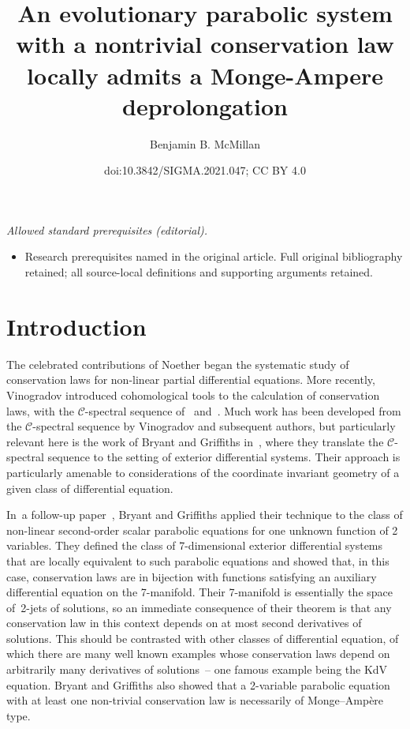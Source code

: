 \documentclass[10pt,a4paper]{amsart}
\title{An evolutionary parabolic system with a nontrivial conservation law locally admits a Monge-Ampere deprolongation}
\author{Benjamin B. McMillan}
\date{doi:10.3842/SIGMA.2021.047; CC BY 4.0}
\numberwithin{equation}{section}
\begin{document}
\maketitle
\noindent\textit{Allowed standard prerequisites (editorial).}\begin{itemize}
\item Research prerequisites named in the original article. Full original bibliography retained; all source-local definitions and supporting arguments retained.
\end{itemize}\medskip
\section{Introduction}

The celebrated contributions of Noether began the systematic study of conservation laws for non-linear partial differential equations. More recently, Vinogradov introduced cohomological tools to the calculation of conservation laws, with the $\mathcal{C}$-spectral sequence of~\cite{Vinogradov:C-SpectralSequenceI} and~\cite{Vinogradov:C-SpectralSequenceII}. Much work has been developed from the $\mathcal{C}$-spectral sequence by Vinogradov and subsequent authors, but particularly relevant here is the work of Bryant and Griffiths in~\cite{Characteristic_Cohomology_I}, where they translate the $\mathcal{C}$-spectral sequence to the setting of exterior differential systems. Their approach is particularly amenable to considerations of the coordinate invariant geometry of a given class of differential equation.

In~a follow-up paper~\cite{Characteristic_Cohomology_II}, Bryant and Griffiths applied their technique to the class of non-linear second-order scalar parabolic equations for one unknown function of 2 variables. They defined the class of 7-dimensional exterior differential systems that are locally equivalent to such parabolic equations and showed that, in this case, conservation laws are in bijection with functions satisfying an auxiliary differential equation on the 7-manifold. Their 7-manifold is essentially the space of~2-jets of solutions, so an immediate consequence of their theorem is that any conservation law in this context depends on at most second derivatives of solutions. This should be contrasted with other classes of differential equation, of which there are many well known examples whose conservation laws depend on arbitrarily many derivatives of solutions~-- one famous example being the KdV equation. Bryant and Griffiths also showed that a 2-variable parabolic equation with at least one non-trivial conservation law is necessarily of Monge--Amp\`ere type.
\end{document}
